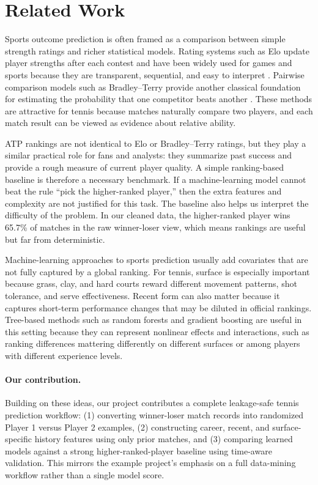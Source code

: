 \documentclass{article}
\begin{document}
\section{Related Work}
\label{sec:related}

Sports outcome prediction is often framed as a comparison between simple strength ratings and richer statistical models. Rating systems such as Elo update player strengths after each contest and have been widely used for games and sports because they are transparent, sequential, and easy to interpret \citep{elo1978}. Pairwise comparison models such as Bradley--Terry provide another classical foundation for estimating the probability that one competitor beats another \citep{bradley1952}. These methods are attractive for tennis because matches naturally compare two players, and each match result can be viewed as evidence about relative ability.

ATP rankings are not identical to Elo or Bradley--Terry ratings, but they play a similar practical role for fans and analysts: they summarize past success and provide a rough measure of current player quality. A simple ranking-based baseline is therefore a necessary benchmark. If a machine-learning model cannot beat the rule ``pick the higher-ranked player,'' then the extra features and complexity are not justified for this task. The baseline also helps us interpret the difficulty of the problem. In our cleaned data, the higher-ranked player wins 65.7\% of matches in the raw winner-loser view, which means rankings are useful but far from deterministic.

Machine-learning approaches to sports prediction usually add covariates that are not fully captured by a global ranking. For tennis, surface is especially important because grass, clay, and hard courts reward different movement patterns, shot tolerance, and serve effectiveness. Recent form can also matter because it captures short-term performance changes that may be diluted in official rankings. Tree-based methods such as random forests \citep{breiman2001} and gradient boosting \citep{friedman2001} are useful in this setting because they can represent nonlinear effects and interactions, such as ranking differences mattering differently on different surfaces or among players with different experience levels.

\paragraph{Our contribution.} Building on these ideas, our project contributes a complete leakage-safe tennis prediction workflow: (1) converting winner-loser match records into randomized Player 1 versus Player 2 examples, (2) constructing career, recent, and surface-specific history features using only prior matches, and (3) comparing learned models against a strong higher-ranked-player baseline using time-aware validation. This mirrors the example project's emphasis on a full data-mining workflow rather than a single model score.
\end{document}
